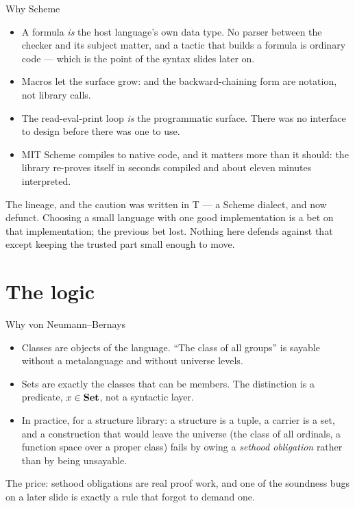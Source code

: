 \documentclass[11pt,aspectratio=169]{beamer}
\begin{document}
\begin{frame}{Why Scheme}
  \begin{itemize}
    \item A formula \emph{is} the host language's own data type. No parser
          between the checker and its subject matter, and a tactic that builds
          a formula is ordinary code --- which is the point of the syntax
          slides later on.
    \item Macros let the surface grow:  and the
          backward-chaining form are notation, not library calls.
    \item The read-eval-print loop \emph{is} the programmatic surface. There
          was no interface to design before there was one to use.
    \item MIT Scheme compiles to native code, and it matters more than it
          should: the library re-proves itself in \Nload{} seconds compiled and
          about eleven minutes interpreted.
  \end{itemize}
  \vfill
  \begin{block}{The lineage, and the caution}
    \imps{} was written in T --- a Scheme dialect, and now defunct. Choosing a
    small language with one good implementation is a bet on that
    implementation; the previous bet lost. Nothing here defends against that
    except keeping the trusted part small enough to move.
  \end{block}
\end{frame}

\section{The logic}

\begin{frame}{Why von Neumann--Bernays}
  \begin{itemize}
    \item Classes are objects of the language. ``The class of all groups'' is
          sayable without a metalanguage and without universe levels.
    \item Sets are exactly the classes that can be members. The distinction is
          a predicate, $x \in \mathbf{Set}$, not a syntactic layer.
    \item In practice, for a structure library: a structure is a tuple, a
          carrier is a set, and a construction that would leave the universe
          (the class of all ordinals, a function space over a proper class)
          fails by owing a \emph{sethood obligation} rather than by being
          unsayable.
  \end{itemize}
  \vfill
  \small The price: sethood obligations are real proof work, and one of the
  soundness bugs on a later slide is exactly a rule that forgot to demand one.
\end{frame}
\end{document}
